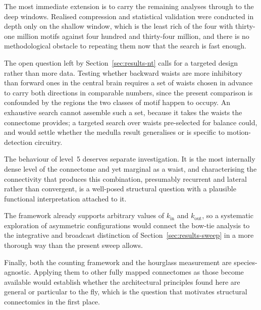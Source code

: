 \documentclass[12pt,a4paper,oneside]{article}
\theoremstyle{definition}
\theoremstyle{plain}
\newcommand{\kin}{k_{\mathrm{in}}}
\newcommand{\kout}{k_{\mathrm{out}}}
\begin{document}
The most immediate extension is to carry the remaining analyses through to
the deep windows. Realised compression and statistical validation were
conducted in depth only on the shallow window, which is the least rich of
the four with thirty-one million motifs against four hundred and thirty-four
million, and there is no methodological obstacle to repeating them now that
the search is fast enough.

The open question left by Section~\ref{sec:results-nt} calls for a targeted
design rather than more data. Testing whether backward waists are more
inhibitory than forward ones in the central brain requires a set of waists
chosen in advance to carry both directions in comparable numbers, since the
present comparison is confounded by the regions the two classes of motif
happen to occupy. An exhaustive search cannot assemble such a set, because it
takes the waists the connectome provides; a targeted search over waists
pre-selected for balance could, and would settle whether the medulla result
generalises or is specific to motion-detection circuitry.

The behaviour of level~5 deserves separate investigation. It is the most
internally dense level of the connectome and yet marginal as a waist, and
characterising the connectivity that produces this combination, presumably
recurrent and lateral rather than convergent, is a well-posed structural
question with a plausible functional interpretation attached to it.

The framework already supports arbitrary values of $\kin$ and $\kout$, so a
systematic exploration of asymmetric configurations would connect the
bow-tie analysis to the integrative and broadcast distinction of
Section~\ref{sec:results-sweep} in a more thorough way than the present
sweep allows.

Finally, both the counting framework and the hourglass measurement are
species-agnostic. Applying them to other fully mapped connectomes as those
become available would establish whether the architectural principles found
here are general or particular to the fly, which is the question that
motivates structural connectomics in the first place.
\end{document}

